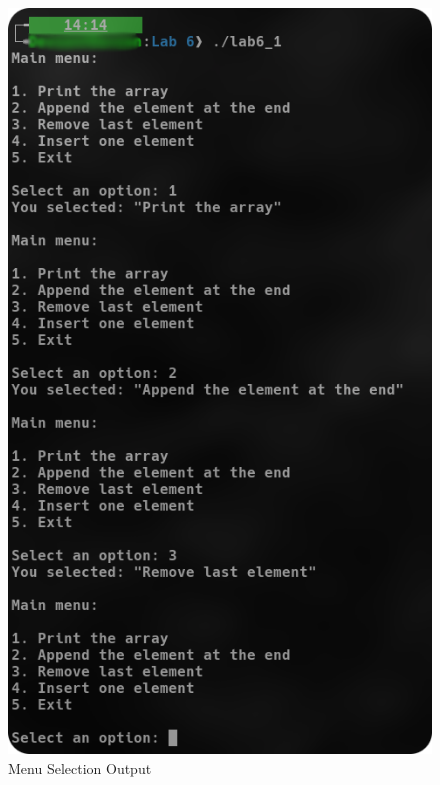 \documentclass[
	letterpaper, %
	10pt, %
]{CSUniSchoolLabReport}
\begin{document}
\begin{figure}[H]
  \centering
  \includegraphics[height=.75\textheight]{Figures/6_1.png}
  \caption{Menu Selection Output}
  \label{fig:2}
\end{figure}
\end{document}
